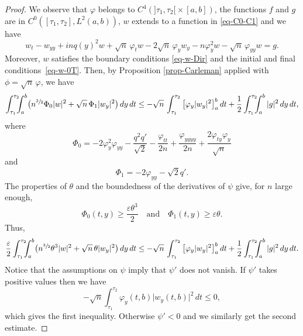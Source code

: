 \documentclass[JEP,XML,SOM,Unicode]{cedram}
\theoremstyle{plain}
\theoremstyle{definition}
\newcommand{\abs}[1]{\vert #1\vert}
\newcommand{\1}{\mathds 1}
\let\e\varepsilon
\let\th\theta
\let\f\varphi
\let\vf\phi
\begin{document}
\begin{proof}
We observe that $\varphi$ belongs to $C^4(]\tau_1,\tau_2[{}\times [a,b])$, the functions $f$ and $g$ are in $C^0([\tau_1,\tau_2], L^2(a,b))$, $w$ extends to a function in \eqref{eq-C0-C1} and we have
\begin{equation*}
w_t - w_{yy} + inq(y)^2 w + \sqrt n\,\f_t w - 2 \sqrt n\,\f_y w_y - n \f_y^2 w - \sqrt n\,\f_{yy} w = g.
\end{equation*}
Moreover, $w$ satisfies the boundary conditions \eqref{eq-w-Dir} and the initial and final conditions~\eqref{eq-w-0T}. Then, by Proposition \ref{prop-Carleman} applied with $\vf = \sqrt n\,\f$, we have
\[
\int_{\tau_1}^{\tau_2}\hspace*{-2mm} \int_a^b \bigl(n^{\sfrac 32} \Phi_0 \abs w^2 + \sqrt n\,\Phi_1 \abs{w_y}^2 \bigr) \, dy \, dt
\leq - \sqrt n\,\int_{\tau_1}^{\tau_2} \big[ \f_y \abs{w_y}^2 \big]_a^b \, dt + \frac 1 2 \int_{\tau_1}^{\tau_2}\hspace*{-2mm} \int_a^b \abs{g}^2 \, dy \, dt ,
\]
where
\begin{equation*}
\Phi_0 = - 2 \f_y^2 \f_{yy} - \frac {q^2 q'}{\sqrt 2} - \frac {\f_{tt}}{2n} + \frac {\f_{yyyy}}{2n} + \frac {2\f_{ty} \f_{y}}{\sqrt n}
\end{equation*}
and
\begin{equation*}
\Phi_1 = - 2 \f_{yy} - \sqrt 2 q'.
\end{equation*}
The properties of $\th$ and the boundedness of the derivatives of $\psi$ give, for $n$ large enough,
\[
\Phi_0(t,y) \geq \frac {\e \th^3} 2 \quad \text{and} \quad \Phi_1(t,y) \geq \e \th.
\]
Thus,
\[
\frac \e 2 \int_{\tau_1}^{\tau_2}\hspace*{-2mm} \int_a^b \bigl(n^{\sfrac 32} \th^3 \abs w^2 + \sqrt n\,\th \abs{w_y}^2 \bigr) \, dy \, dt
\leq - \sqrt n\,\int_{\tau_1}^{\tau_2} \big[ \f_y \abs{w_y}^2 \big]_a^b \, dt + \frac 12 \int_{\tau_1}^{\tau_2}\hspace*{-2mm} \int_a^b \abs g^2 \, dy \, dt.
\]
Notice that the assumptions on $\psi$ imply that $\psi'$ does not vanish. If $\psi'$ takes positive values then we have
\[
- \sqrt n \int_{\tau_1}^{\tau_2} \f_y(t,b) \abs{w_y(t,b)}^2 \, dt \leq 0,
\]
which gives the first inequality. Otherwise $\psi' < 0$ and we similarly get the second estimate.
\end{proof}

 \label{sec-observability-fin}
\end{document}
